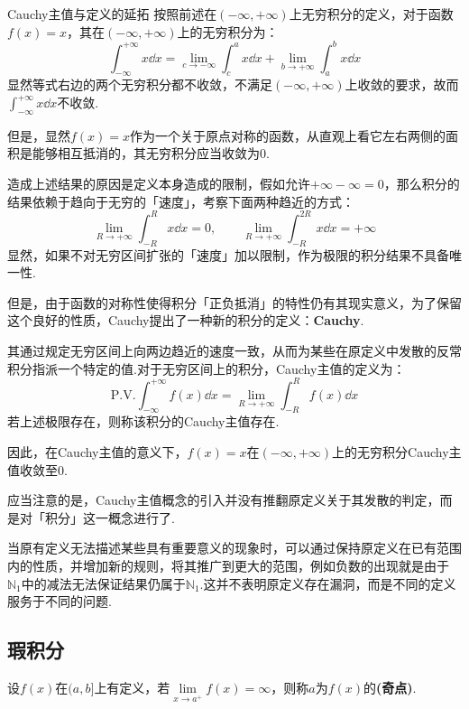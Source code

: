 \begin{extension}{Cauchy主值与定义的延拓}
    按照前述在$(-\infty,+\infty)$上无穷积分的定义，对于函数$f(x)=x$，其在$(-\infty,+\infty)$上的无穷积分为：
    \[\int_{-\infty}^{+\infty}x\dd{x} = \lim_{c\to -\infty}\int_{c}^{a}x\dd{x} + \lim_{b\to +\infty}\int_{a}^{b}x\dd{x}\]
    显然等式右边的两个无穷积分都不收敛，不满足$(-\infty,+\infty)$上收敛的要求，故而$\displaystyle\int_{-\infty}^{+\infty}x\dd{x}$不收敛.

    但是，显然$f(x)=x$作为一个关于原点对称的函数，从直观上看它左右两侧的面积是能够相互抵消的，其无穷积分应当收敛为$0$.

    造成上述结果的原因是定义本身造成的限制，假如允许$+\infty-\infty=0$，那么积分的结果依赖于趋向于无穷的「速度」，考察下面两种趋近的方式：
    \[\lim_{R\to+\infty}\int_{-R}^{R}x\dd{x} = 0,\qquad \lim_{R\to+\infty}\int_{-R}^{2R}x\dd{x}=+\infty\]
    显然，如果不对无穷区间扩张的「速度」加以限制，作为极限的积分结果不具备唯一性.

    但是，由于函数的对称性使得积分「正负抵消」的特性仍有其现实意义，为了保留这个良好的性质，Cauchy提出了一种新的积分的定义：\textbf{Cauchy}.

    其通过规定无穷区间上向两边趋近的速度一致，从而为某些在原定义中发散的反常积分指派一个特定的值.对于无穷区间上的积分，Cauchy主值的定义为：
    \[\text{P.V.}\int_{-\infty}^{+\infty}f(x)\dd{x} = \lim_{R\to+\infty}\int_{-R}^{R}f(x)\dd{x}\]
    若上述极限存在，则称该积分的Cauchy主值存在.

    因此，在Cauchy主值的意义下，$f(x)=x$在$(-\infty,+\infty)$上的无穷积分Cauchy主值收敛至$0$.

    应当注意的是，Cauchy主值概念的引入并没有推翻原定义关于其发散的判定，而是对「积分」这一概念进行了.

    当原有定义无法描述某些具有重要意义的现象时，可以通过保持原定义在已有范围内的性质，并增加新的规则，将其推广到更大的范围，例如负数的出现就是由于$\mathbb{N}_1$中的减法无法保证结果仍属于$\mathbb{N}_1$.这并不表明原定义存在漏洞，而是不同的定义服务于不同的问题.
\end{extension}


\subsection{瑕积分}
\begin{definition}
    设$f(x)$在$(a,b]$上有定义，若$\lim\limits_{x \to a^+}f(x)=\infty$，则称$a$为$f(x)$的\textbf{(奇点)}.
\end{definition}


